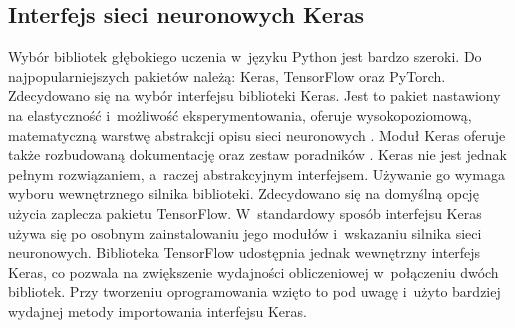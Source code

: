 \subsection{Interfejs sieci neuronowych Keras}
\label{subsec:software_network}
Wybór bibliotek głębokiego uczenia w~języku Python jest bardzo szeroki.
Do najpopularniejszych pakietów należą: Keras, TensorFlow oraz PyTorch.
Zdecydowano się na wybór interfejsu biblioteki Keras.
Jest to pakiet nastawiony na elastyczność i~możliwość eksperymentowania, oferuje
wysokopoziomową, matematyczną warstwę abstrakcji opisu sieci
neuronowych \cite{chollet_keras}.
Moduł Keras oferuje także rozbudowaną dokumentację oraz zestaw poradników
\cite{keras_docs}.
Keras nie jest jednak pełnym rozwiązaniem, a~raczej abstrakcyjnym interfejsem.
Używanie go wymaga wyboru wewnętrznego silnika biblioteki.
Zdecydowano się na domyślną opcję użycia zaplecza pakietu TensorFlow.
W~standardowy sposób interfejsu Keras używa się po osobnym zainstalowaniu jego
modułów i~wskazaniu silnika sieci neuronowych.
Biblioteka TensorFlow udostępnia jednak wewnętrzny interfejs Keras, co pozwala
na zwiększenie wydajności obliczeniowej w~połączeniu dwóch bibliotek.
Przy tworzeniu oprogramowania wzięto to pod uwagę i~użyto bardziej wydajnej
metody importowania interfejsu Keras.
